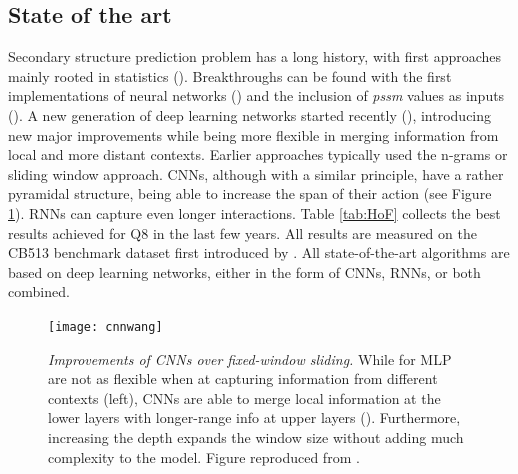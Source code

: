 \subsection{State of the art}
Secondary structure prediction problem has a long history, with first approaches mainly rooted in statistics (\cite{Chou1974}). Breakthroughs can be found with the first implementations of neural networks (\cite{Qian1988}) and the inclusion of \textit{pssm} values as inputs (\cite{Rost1993}). A new generation of deep learning networks started recently (\cite{Zhou2014}), introducing new major improvements while being more flexible in merging information from local and more distant contexts. Earlier approaches typically used the n-grams or sliding window approach. CNNs, although with a similar principle, have a rather pyramidal structure, being able to increase the span of their action (see Figure \ref{fig:cnnwang}). RNNs can capture even longer interactions. Table \ref{tab:HoF} collects the best results achieved for Q8 in the last few years. All results are measured on the CB513 benchmark dataset first introduced by \cite{Zhou2014}. All state-of-the-art algorithms are based on deep learning networks, either in the form of CNNs, RNNs, or both combined.

\begin{figure}
	\centering
	\texttt{[image: cnnwang]}
	\caption{\textit{Improvements of CNNs over fixed-window sliding.} While for MLP are not as flexible when at capturing information from different contexts (left), CNNs are able to merge local information at the lower layers with longer-range info at upper layers (\cite{Busia2017}). Furthermore, increasing the depth expands the window size without adding much complexity to the model. Figure reproduced from \cite{Wang2016}.}
	\label{fig:cnnwang}
\end{figure}

